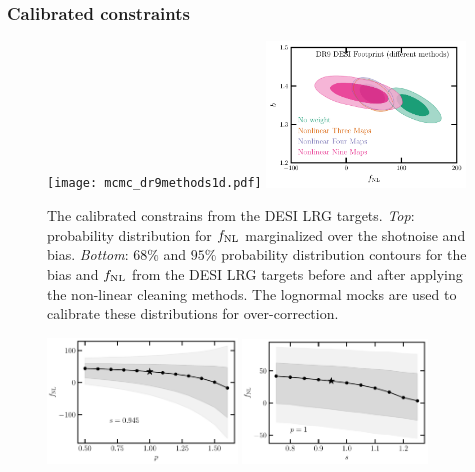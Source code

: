 \subsubsection{Calibrated constraints}

\begin{figure}
    \raggedleft
    \texttt{[image: mcmc\_dr9methods1d.pdf]}
    \includegraphics[width=0.47\textwidth, trim={0 0 0.15cm 0.2cm},clip]{figures/mcmc_dr9methods.pdf} 
    \caption{The calibrated constrains from the DESI LRG targets. \textit{Top}: probability distribution for $f_{\rm NL}$ marginalized over the shotnoise and bias. \textit{Bottom}: $68\%$ and $95\%$ probability distribution contours for the bias and $f_{\rm NL}$ from the DESI LRG targets before and after applying the non-linear cleaning methods. The lognormal mocks are used to calibrate these distributions for over-correction.}\label{fig:mcmc_dr9}
\end{figure}

\begin{figure}
\raggedleft
\includegraphics[width=0.45\textwidth]{figures/fnl_p.pdf}
\includegraphics[width=0.437\textwidth]{figures/fnl_magbias.pdf}
\caption{}\label{fig:fnl_magbias}
\end{figure}

